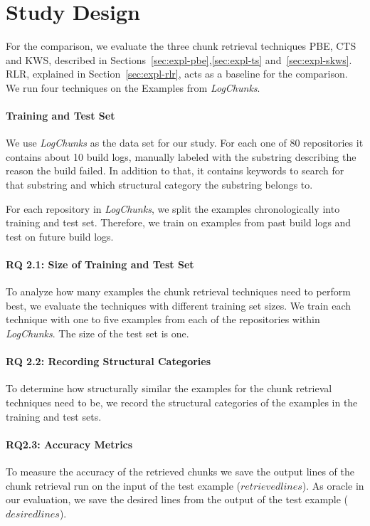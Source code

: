 \documentclass[\myrootdir/main.tex]{subfiles}
\begin{document}
\section{Study Design}
For the comparison, we evaluate the three chunk retrieval techniques PBE, CTS and KWS, described in Sections~\ref{sec:expl-pbe},\ref{sec:expl-ts} and~\ref{sec:expl-skws}.
RLR, explained in Section~\ref{sec:expl-rlr}, acts as a baseline for the comparison.
We run four techniques on the Examples from \emph{LogChunks}.
\paragraph{Training and Test Set}
We use \emph{LogChunks} as the data set for our study.
For each one of 80 repositories it contains about 10 build logs, manually labeled with the substring describing the reason the build failed.
In addition to that, it contains keywords to search for that substring and which structural category the substring belongs to.

For each repository in \emph{LogChunks}, we split the examples chronologically into training and test set.
Therefore, we train on examples from past build logs and test on future build logs.

\paragraph{RQ 2.1: Size of Training and Test Set}
To analyze how many examples the chunk retrieval techniques need to perform best, we evaluate the techniques with different training set sizes.
We train each technique with one to five examples from each of the repositories within \emph{LogChunks}.
The size of the test set is one.

\paragraph{RQ 2.2: Recording Structural Categories}
To determine how structurally similar the examples for the chunk retrieval techniques need to be, we record the structural categories of the examples in the training and test sets.

\paragraph{RQ2.3: Accuracy Metrics}
To measure the accuracy of the retrieved chunks we save the output lines of the chunk retrieval run on the input of the test example ($retrievedlines$).
As oracle in our evaluation, we save the desired lines from the output of the test example ($desiredlines$).
\end{document}
